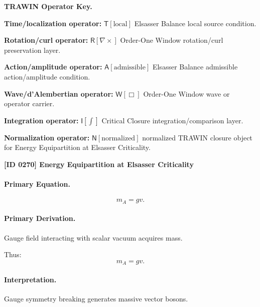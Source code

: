 \par\vspace{0.45\baselineskip}
\noindent\begin{minipage}[t]{\linewidth}
\begingroup
\small
\raggedright
\textbf{TRAWIN Operator Key.}\par
\noindent\textbf{Time/localization operator:} $\mathsf{T}\!\left[\mathrm{local}\right]$ Elsasser Balance local source condition.\par
\noindent\textbf{Rotation/curl operator:} $\mathsf{R}\!\left[\nabla\times\right]$ Order-One Window rotation/curl preservation layer.\par
\noindent\textbf{Action/amplitude operator:} $\mathsf{A}\!\left[\mathrm{admissible}\right]$ Elsasser Balance admissible action/amplitude condition.\par
\noindent\textbf{Wave/d'Alembertian operator:} $\mathsf{W}\!\left[\Box\right]$ Order-One Window wave or operator carrier.\par
\noindent\textbf{Integration operator:} $\mathsf{I}\!\left[\int\right]$ Critical Closure integration/comparison layer.\par
\noindent\textbf{Normalization operator:} $\mathsf{N}\!\left[\mathrm{normalized}\right]$ normalized TRAWIN closure object for Energy Equipartition at Elsasser Criticality.\par
\endgroup
\end{minipage}

\clearpage
\noindent\textbf{[ID 0270] Energy Equipartition at Elsasser Criticality}\par
\vspace{0.35em}
\paragraph{Primary Equation.}
\begin{equation}
m_A = gv.
\end{equation}

\paragraph{Primary Derivation.}
Gauge field interacting with scalar vacuum acquires mass.

Thus:
\begin{equation}
\boxed{
m_A = gv.
}
\end{equation}

\paragraph{Interpretation.}
Gauge symmetry breaking generates massive vector bosons.

